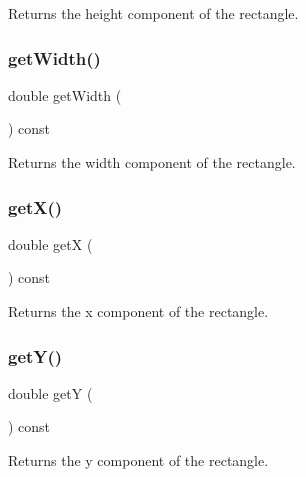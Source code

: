 Returns the height component of the rectangle. 

\mbox{\label{classGRectangle_a0ed2965abd4f5701d2cadf71239faf19}} 
\subsubsection{\texorpdfstring{get\+Width()}{getWidth()}}
{\footnotesize\ttfamily double get\+Width (\begin{DoxyParamCaption}{ }\end{DoxyParamCaption}) const}



Returns the width component of the rectangle. 

\mbox{\label{classGRectangle_a344385751bee0720059403940d57a13e}} 
\subsubsection{\texorpdfstring{get\+X()}{getX()}}
{\footnotesize\ttfamily double getX (\begin{DoxyParamCaption}{ }\end{DoxyParamCaption}) const}



Returns the x component of the rectangle. 

\mbox{\label{classGRectangle_aafa51c7f8f38a09febbb9ce7853f77b4}} 
\subsubsection{\texorpdfstring{get\+Y()}{getY()}}
{\footnotesize\ttfamily double getY (\begin{DoxyParamCaption}{ }\end{DoxyParamCaption}) const}



Returns the y component of the rectangle. 

\mbox{\label{classGRectangle_acf82f9b2937375c7b1cf3dccb3df3312}} 
